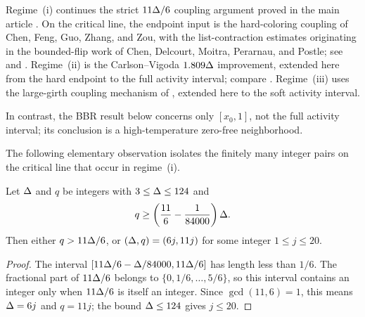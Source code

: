 \begin{remark}
Regime~\textup{(i)} continues the strict \(11\Delta/6\) coupling argument
proved in the main article \cite{ShaoShi2026ZeroFreeness}.  On the critical line, the endpoint input is the
hard-coloring coupling of Chen, Feng, Guo, Zhang, and Zou, with the
list-contraction estimates originating in the bounded-flip work of Chen,
Delcourt, Moitra, Perarnau, and Postle; see
\cite[Theorem~20 and Proposition~22]{CFFGZZ2024} and
\cite[Section~6 and Appendix~E]{CDMPP2019}.  Regime~\textup{(ii)} is the
Carlson--Vigoda \(1.809\Delta\) improvement, extended here from the hard
endpoint to the full activity interval; compare
\cite{CarlsonVigoda2024}.  Regime~\textup{(iii)} uses the large-girth
coupling mechanism of \cite{CLMM2023}, extended here to the soft activity
interval.

In contrast, the BBR result below concerns only \([x_0,1]\), not the
full activity interval; its conclusion is a high-temperature zero-free
neighborhood.
\end{remark}

The following elementary observation isolates the finitely many integer
pairs on the critical line that occur in regime~\textup{(i)}.

\begin{lemma}
\label{lem:int-reduction}
Let \(\Delta\) and \(q\) be integers with \(3\le\Delta\le124\) and
\[
  q\ge\left(\frac{11}{6}-\frac1{84000}\right)\Delta.
\]
Then either \(q>11\Delta/6\), or
\((\Delta,q)=(6j,11j)\) for some integer \(1\le j\le20\).
\end{lemma}

\begin{proof}
The interval
\([11\Delta/6-\Delta/84000,11\Delta/6]\) has length less than \(1/6\).
The fractional part of \(11\Delta/6\) belongs to
\(\{0,1/6,\ldots,5/6\}\), so this interval contains an integer only when
\(11\Delta/6\) is itself an integer.  Since \(\gcd(11,6)=1\), this means
\(\Delta=6j\) and \(q=11j\); the bound \(\Delta\le124\) gives \(j\le20\).
\end{proof}

